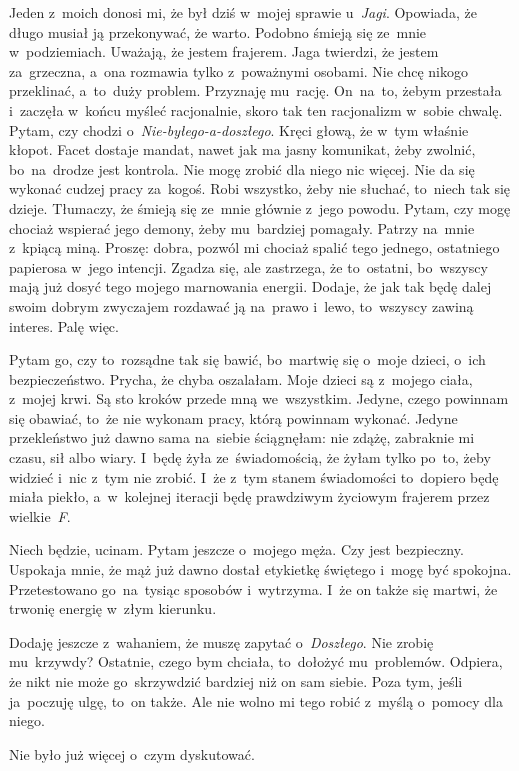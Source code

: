 \documentclass[9pt, a5paper]{memoir}
\begin{document}
Jeden z~moich donosi mi, że był dziś w~mojej sprawie u~\textit{Jagi}. Opowiada, że długo musiał ją przekonywać, że warto. Podobno śmieją się ze~mnie w~podziemiach. Uważają, że jestem frajerem. Jaga twierdzi, że jestem za~grzeczna, a~ona rozmawia tylko z~poważnymi osobami. Nie chcę nikogo przeklinać, a~to~duży problem. Przyznaję mu~rację. On~na~to, żebym przestała i~zaczęła w~końcu myśleć racjonalnie, skoro tak ten racjonalizm w~sobie chwalę. Pytam, czy chodzi o~\textit{Nie-byłego-a-doszłego}. Kręci głową, że w~tym właśnie kłopot. Facet dostaje mandat, nawet jak ma jasny komunikat, żeby zwolnić, bo~na~drodze jest kontrola. Nie mogę zrobić dla niego nic więcej. Nie da się wykonać cudzej pracy za~kogoś. Robi wszystko, żeby nie słuchać, to~niech tak się dzieje. Tłumaczy, że śmieją się ze~mnie głównie z~jego powodu. Pytam, czy mogę chociaż wspierać jego demony, żeby mu~bardziej pomagały. Patrzy na~mnie z~kpiącą miną. Proszę: dobra, pozwól mi chociaż spalić tego jednego, ostatniego papierosa w~jego intencji. Zgadza się, ale zastrzega, że to~ostatni, bo~wszyscy mają już dosyć tego mojego marnowania energii. Dodaje, że jak tak będę dalej swoim dobrym zwyczajem rozdawać ją na~prawo i~lewo, to~wszyscy zawiną interes. Palę więc.

Pytam go, czy to~rozsądne tak się bawić, bo~martwię się o~moje dzieci, o~ich bezpieczeństwo. Prycha, że chyba oszalałam. Moje dzieci są z~mojego ciała, z~mojej krwi. Są sto kroków przede mną we~wszystkim. Jedyne, czego powinnam się obawiać, to~że nie wykonam pracy, którą powinnam wykonać. Jedyne przekleństwo już dawno sama na~siebie ściągnęłam: nie zdążę, zabraknie mi czasu, sił albo wiary. I~będę żyła ze~świadomością, że żyłam tylko po~to, żeby widzieć i~nic z~tym nie zrobić. I~że z~tym stanem świadomości to~dopiero będę miała piekło, a~w~kolejnej iteracji będę prawdziwym życiowym frajerem przez wielkie~\textit{F}.

Niech będzie, ucinam. Pytam jeszcze o~mojego męża. Czy jest bezpieczny. Uspokaja mnie, że mąż już dawno dostał etykietkę świętego i~mogę być spokojna. Przetestowano go~na~tysiąc sposobów i~wytrzyma. I~że on także się martwi, że trwonię energię w~złym kierunku.

Dodaję jeszcze z~wahaniem, że muszę zapytać o~\textit{Doszłego}. Nie zrobię mu~krzywdy? Ostatnie, czego bym chciała, to~dołożyć mu~problemów. Odpiera, że nikt nie może go~skrzywdzić bardziej niż on sam siebie. Poza tym, jeśli ja~poczuję ulgę, to~on także. Ale nie wolno mi tego robić z~myślą o~pomocy dla niego.

Nie było już więcej o~czym dyskutować.
\end{document}
